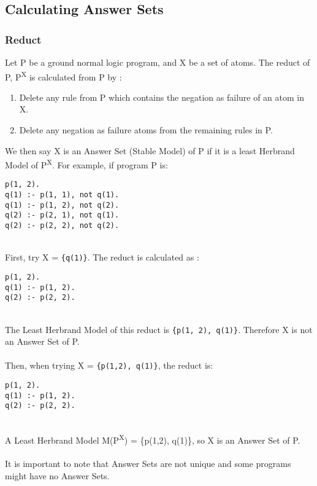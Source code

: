\subsection{Calculating Answer Sets}

\subsubsection{Reduct}

Let P be a ground normal logic program, and X be a set of atoms. The reduct of P, P\textsuperscript{X} is calculated from P by :

\begin{enumerate}
\item Delete any rule from P which contains the negation as failure of an atom in X.
\item Delete any negation as failure atoms from the remaining rules in P.
\end{enumerate}
We then say X is an Answer Set (Stable Model) of P if it is a least Herbrand Model of  P\textsuperscript{X}. For example, if program P is:\\

\begin{lstlisting}
p(1, 2).
q(1) :- p(1, 1), not q(1).
q(1) :- p(1, 2), not q(2).
q(2) :- p(2, 1), not q(1).
q(2) :- p(2, 2), not q(2).
\end{lstlisting}
\mbox{}\\
First, try X = \lstinline!{q(1)}!. The reduct is calculated as : \\

\begin{lstlisting}
p(1, 2).
q(1) :- p(1, 2).
q(2) :- p(2, 2).
\end{lstlisting}
\mbox{}\\
The Least Herbrand Model of this reduct is \lstinline!{p(1, 2), q(1)}!. Therefore X is not an Answer Set of P. \\ \\
Then, when trying X = \lstinline!{p(1,2), q(1)}!, the reduct is:\\

\begin{lstlisting}
p(1, 2).
q(1) :- p(1, 2).
q(2) :- p(2, 2).
\end{lstlisting}
\mbox{}\\
A Least Herbrand Model M(P\textsuperscript{X}) = \{p(1,2), q(1)\}, so X is an Answer Set of P. \\ \\
It is important to note that Answer Sets are not unique and some programs might have no Answer Sets.

